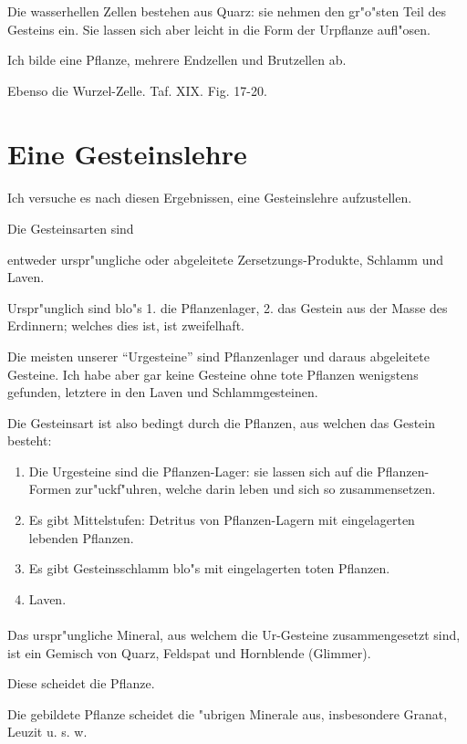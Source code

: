 \documentclass[a4paper, 11pt, oneside, german]{article}
\begin{document}
Die wasserhellen Zellen bestehen aus Quarz: sie nehmen den gr"o"sten Teil des Gesteins ein. Sie lassen sich aber leicht in die Form der Urpflanze aufl"osen.

Ich bilde eine Pflanze, mehrere Endzellen und Brutzellen ab.

Ebenso die Wurzel-Zelle. Taf. XIX. Fig. 17-20.
\clearpage
\section{Eine Gesteinslehre}
\paragraph{}
Ich versuche es nach diesen Ergebnissen, eine Gesteinslehre aufzustellen.

Die Gesteinsarten sind

entweder urspr"ungliche oder abgeleitete Zersetzungs-Produkte, Schlamm und Laven.

Urspr"unglich sind blo"s 1. die Pflanzenlager, 2. das Gestein aus der Masse des Erdinnern; welches dies ist, ist zweifelhaft.

Die meisten unserer "`Urgesteine"' sind Pflanzenlager und daraus abgeleitete Gesteine. Ich habe aber gar keine Gesteine ohne tote Pflanzen wenigstens gefunden, letztere in den Laven und Schlammgesteinen.

Die Gesteinsart ist also bedingt durch die Pflanzen, aus welchen das Gestein besteht:
\begin{enumerate}[label=\Alph*]
\item Die Urgesteine sind die Pflanzen-Lager: sie lassen sich auf die Pflanzen-Formen zur"uckf"uhren, welche darin leben und sich so zusammensetzen.
\item Es gibt Mittelstufen: Detritus von Pflanzen-Lagern mit eingelagerten lebenden Pflanzen.
\item Es gibt Gesteinsschlamm blo"s mit eingelagerten toten Pflanzen.
\item Laven.
\end{enumerate}
\paragraph{}
Das urspr"ungliche Mineral, aus welchem die Ur-Gesteine zusammengesetzt sind, ist ein Gemisch von Quarz, Feldspat und Hornblende (Glimmer).

Diese scheidet die Pflanze.

Die gebildete Pflanze scheidet die "ubrigen Minerale aus, insbesondere Granat, Leuzit u. s. w.
\end{document}
